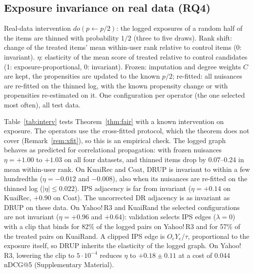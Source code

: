 \subsection{Exposure invariance on real data (RQ4)}\label{sec:fair}

\begin{table}[t]\centering\small
\caption{Real-data intervention $do(p\leftarrow p/2)$: the logged exposures of a
random half of the items are thinned with probability $1/2$ (three to five
draws). Rank shift: change of the treated items' mean within-user rank
relative to control items (0: invariant). $\eta$: elasticity of the mean score
of treated relative to control candidates (1: exposure-proportional, 0:
invariant). Frozen: imputation and degree weights $C$ are kept, the propensities
are updated to the known $p/2$; re-fitted: all nuisances are re-fitted on the thinned
log, with the known propensity change or with propensities re-estimated on it. One configuration
per operator (the one selected most often), all test data.}\label{tab:interv}
\begin{adjustbox}{max width=\textwidth}

\end{adjustbox}
\end{table}

Table~\ref{tab:interv} tests Theorem~\ref{thm:fair} with a known intervention on
exposure. The operators use the cross-fitted protocol, which the theorem does not
cover (Remark~\ref{rem:xfit}), so this is an empirical check. The logged graph
behaves as predicted for correlational propagation: with frozen nuisances
$\eta=+1.00$ to $+1.03$ on all four datasets, and thinned items drop by 0.07--0.24 in
mean within-user rank. On KuaiRec and Coat, DRUP is invariant to within a few
hundredths ($\eta=-0.012$ and $-0.008$), also when its nuisances are re-fitted on the
thinned log ($|\eta|\le0.022$). IPS adjacency is far from invariant ($\eta=+0.14$ on
KuaiRec, $+0.90$ on Coat). The uncorrected DR adjacency is as invariant as DRUP on
these data. On Yahoo!\,R3 and KuaiRand the selected configurations are not invariant
($\eta=+0.96$ and $+0.64$): validation selects IPS edges ($\lambda=0$) with a clip that
binds for 82\% of the logged pairs on Yahoo!\,R3 and for 57\% of the treated pairs on
KuaiRand. A clipped IPS edge is $O_eY_e/\tau$, proportional to the exposure itself, so
DRUP inherits the elasticity of the logged graph. On Yahoo!\,R3, lowering the clip to
$5\cdot10^{-4}$ reduces $\eta$ to $+0.18\pm0.11$ at a cost of 0.044 nDCG@5
(Supplementary Material).

